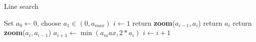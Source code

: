 \documentclass{article}
\begin{document}
    \begin{algorithm}
        \caption{Line search}
        \label{alg:linesearh}
        \begin{algorithmic}
            \State Set $a_0 \gets 0$, choose $a_1 \in (0, a_{max})$
            \State $i \gets 1$
            \Repeat
                    \State return \textbf{zoom}($a_{i-1}, a_i$)
                \EndIf
                    \State return $a_i$
                \EndIf
                    \State return \textbf{zoom}($a_i, a_{i-1}$)
                \EndIf
                \State $a_{i+1} \gets \min({a_max, 2*a_i})$
                \State $i \gets i+1$
            \Until
        \end{algorithmic}
    \end{algorithm}
\end{document}
